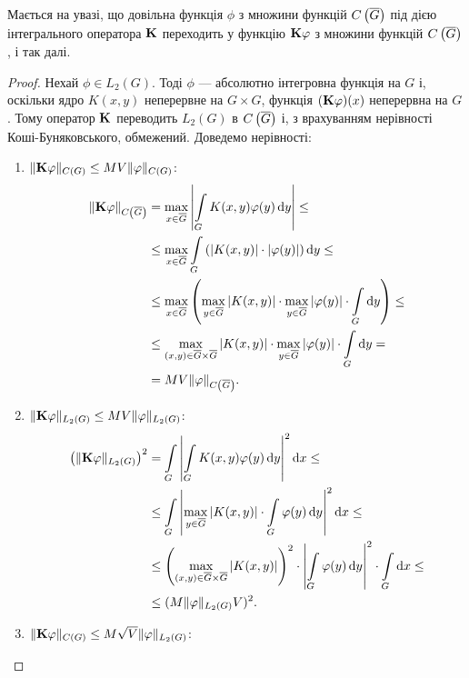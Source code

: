 \begin{remark}
	Мається на увазі, що довільна функція $\phi$ з множини функцій $\CoG$ під дією інтегрального оператора $\bf{K}$ переходить у функцію $\bf{K}\phi$ з множини функцій $\CoG$, і так далі.
\end{remark}

\begin{proof}
	Нехай $\phi \in L_2(G)$. Тоді $\phi$ --- абсолютно інтегровна функція на $G$ і, оскільки ядро $K(x, y)$ неперервне на $G \times G$, функція $(\bf{K}\phi)(x)$ неперервна на $G$. Тому оператор $\bf{K}$ переводить $L_2(G)$ в $\CoG$ і, з врахуванням нерівності Коші-Буняковського, обмежений. Доведемо нерівності:
	\begin{enumerate}
		\item $\| \bf{K} \phi \|_{C(G)} \le M V \| \phi \|_{C(G)}$:
		\begin{equation}
			\begin{aligned}
				\| \bf{K} \phi \|_{\CoG} &= \Max_{x \in \oG} \left| \Int_G K(x, y) \phi(y) \diff y \right| \le \\
				&\le \Max_{x \in \oG} \Int_G \left( |K(x, y)| \cdot |\phi(y)| \right) \diff y \le \\
				&\le \Max_{x \in \oG} \left( \Max_{y \in \oG} |K(x, y)| \cdot \Max_{y \in \oG} |\phi(y)| \cdot \Int_G \diff y \right) \le \\
				&\le \Max_{(x, y) \in \oG \times \oG} |K(x, y)| \cdot \Max_{y \in \oG} |\phi(y)| \cdot \Int_G \diff y = \\
				&= M V \|\phi\|_{\CoG}.
			\end{aligned}
		\end{equation}
		\item $\| \bf{K} \phi \|_{L_2(G)} \le M V \| \phi \|_{L_2(G)}$:
		\begin{equation}
			\begin{aligned}
				\left( \| \bf{K} \phi \|_{L_2(G)} \right)^2 &= \Int_G \left| \Int_G K(x, y) \phi(y) \diff y \right|^2 \diff x \le \\
				&\le \Int_G \left| \Max_{y \in \oG} |K(x, y)| \cdot \Int_G \phi(y) \diff y \right|^2 \diff x \le \\
				&\le \left( \Max_{(x, y) \in \oG \times \oG} |K(x, y)| \right)^2 \cdot \left| \Int_G \phi(y) \diff y \right|^2 \cdot \Int_G \diff x \le \\
				&\le (M \| \phi\|_{L_2(G)} V)^2.
			\end{aligned}
		\end{equation}
		\item $\| \bf{K} \phi \|_{C(G)} \le M \sqrt{V} \| \phi \|_{L_2(G)}$:

\end{enumerate}
\end{proof}
